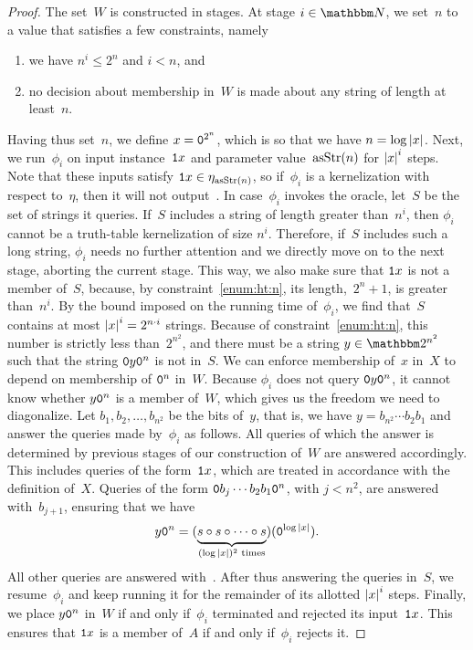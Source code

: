 \begin{proof}
  The set~$W$ is constructed in stages.
  At stage $i \in \bbN$, we set~$n$ to a value that satisfies a few constraints, namely
  \begin{enumerate}
  \item\label{enum:ht:n}
    we have $n^i \le 2^n$ and $i < n$, and
  \item
    no decision about membership in~$W$ is made about any string of length at least~$n$.
  \end{enumerate}
  Having thus set~$n$, we define $x = \textnormal{\texttt{0}}^{2^n}$, which is so that we have $n = \log{\lvert x\rvert}$.
  Next, we run~$\phi_i$ on input instance~$\textnormal{\texttt{1}}x$ and parameter value~$\operatorname{asStr}(n)$ for ${\lvert x\rvert}^i$ steps.
  Note that these inputs satisfy $\textnormal{\texttt{1}}x \in \eta_{\operatorname{asStr}(n)}$, so if~$\phi_i$ is a kernelization with respect to~$\eta$, then it will not output~.
  In case~$\phi_i$ invokes the oracle, let~$S$ be the set of strings it queries.
  If~$S$ includes a string of length greater than~$n^i$, then $\phi_i$ cannot be a truth-table kernelization of size $n^i$.
  Therefore, if~$S$ includes such a long string, $\phi_i$ needs no further attention and we directly move on to the next stage, aborting the current stage.
  This way, we also make sure that $\textnormal{\texttt{1}}x$ is not a member of~$S$, because, by constraint~\ref{enum:ht:n}, its length,~$2^n + 1$, is greater than~$n^i$.
  By the bound imposed on the running time of~$\phi_i$, we find that~$S$ contains at most ${\lvert x\rvert}^i = 2^{n \cdot i}$ strings.
  Because of constraint~\ref{enum:ht:n}, this number is strictly less than~$2^{n^2}$, and there must be a string $y \in \binary^{n^2}$ such that the string $\textnormal{\texttt{0}}y\textnormal{\texttt{0}}^n$ is not in~$S$.
  We can enforce membership of~$x$ in~$X$ to depend on membership of $\textnormal{\texttt{0}}^n$ in~$W$.
  Because $\phi_i$ does not query $\textnormal{\texttt{0}}y\textnormal{\texttt{0}}^n$, it cannot know whether $y\textnormal{\texttt{0}}^n$ is a member of~$W$, which gives us the freedom we need to diagonalize.
  Let $b_1, b_2, \ldots, b_{n^2}$ be the bits of~$y$, that is, we have $y = b_{n^2}\cdots b_2b_1$ and answer the queries made by~$\phi_i$ as follows.
  All queries of which the answer is determined by previous stages of our construction of~$W$ are answered accordingly.
  This includes queries of the form~$\textnormal{\texttt{1}}x$, which are treated in accordance with the definition of~$X$.
  Queries of the form $\textnormal{\texttt{0}}b_j\cdots b_2b_1\textnormal{\texttt{0}}^n$, with $j < n^2$, are answered with~$b_{j + 1}$, ensuring that we have
  \begin{equation*}
    y\textnormal{\texttt{0}}^n = (\underbrace{\vphantom{()}s \circ s \circ \cdots \circ s}_{(\log{\lvert x\rvert})^2\text{ times}})(\textnormal{\texttt{0}}^{\log{\lvert x\rvert}}).
  \end{equation*}
  All other queries are answered with~.
  After thus answering the queries in~$S$, we resume~$\phi_i$ and keep running it for the remainder of its allotted ${\lvert x\rvert}^i$ steps.
  Finally, we place $y\textnormal{\texttt{0}}^n$ in~$W$ if and only if~$\phi_i$ terminated and rejected its input~$\textnormal{\texttt{1}}x$.
  This ensures that $\textnormal{\texttt{1}}x$ is a member of~$A$ if and only if~$\phi_i$ rejects it.


\end{proof}
